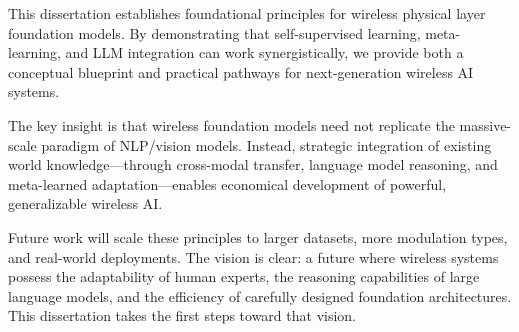 This dissertation establishes foundational principles for wireless physical layer foundation models. By demonstrating that self-supervised learning, meta-learning, and LLM integration can work synergistically, we provide both a conceptual blueprint and practical pathways for next-generation wireless AI systems.

The key insight is that wireless foundation models need not replicate the massive-scale paradigm of NLP/vision models. Instead, strategic integration of existing world knowledge—through cross-modal transfer, language model reasoning, and meta-learned adaptation—enables economical development of powerful, generalizable wireless AI.

Future work will scale these principles to larger datasets, more modulation types, and real-world deployments. The vision is clear: a future where wireless systems possess the adaptability of human experts, the reasoning capabilities of large language models, and the efficiency of carefully designed foundation architectures. This dissertation takes the first steps toward that vision.
